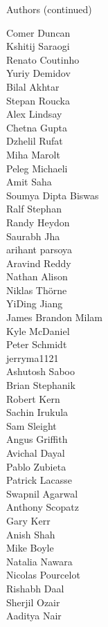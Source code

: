 \begin{frame}{Authors (continued)}
\begin{multicols}{5}
\tiny
Comer Duncan\\
Kshitij Saraogi\\
Renato Coutinho\\
Yuriy Demidov\\
Bilal Akhtar\\
Stepan Roucka\\
Alex Lindsay\\
Chetna Gupta\\
Dzhelil Rufat\\
Miha Marolt\\
Peleg Michaeli\\
Amit Saha\\
Soumya Dipta Biswas\\
Ralf Stephan\\
Randy Heydon\\
Saurabh Jha\\
arihant parsoya\\
Aravind Reddy\\
Nathan Alison\\
Niklas Thörne\\
YiDing Jiang\\
James Brandon Milam\\
Kyle McDaniel\\
Peter Schmidt\\
jerryma1121\\
Ashutosh Saboo\\
Brian Stephanik\\
Robert Kern\\
Sachin Irukula\\
Sam Sleight\\
Angus Griffith\\
Avichal Dayal\\
Pablo Zubieta\\
Patrick Lacasse\\
Swapnil Agarwal\\
Anthony Scopatz\\
Gary Kerr\\
Anish Shah\\
Mike Boyle\\
Natalia Nawara\\
Nicolas Pourcelot\\
Rishabh Daal\\
Sherjil Ozair\\
Aaditya Nair\\

\end{multicols}
\end{frame}

